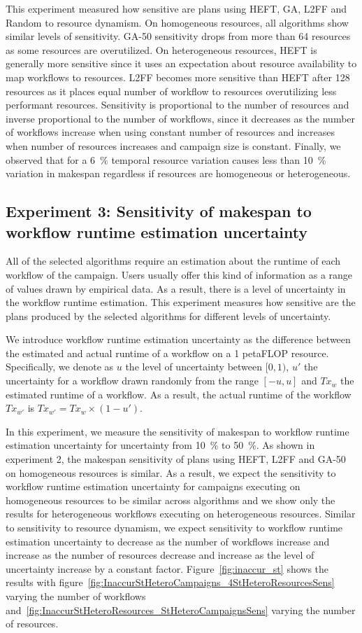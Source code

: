 This experiment measured how sensitive are plans using HEFT, GA, L2FF and Random to resource dynamism.
On homogeneous resources, all algorithms show similar levels of sensitivity.
GA-50 sensitivity drops from more than 64 resources as some resources are overutilized.
On heterogeneous resources, HEFT is generally more sensitive since it uses an expectation about resource availability to map workflows to resources.
L2FF becomes more sensitive than HEFT after 128 resources as it places equal number of workflow to resources overutilizing less performant resources.
Sensitivity is proportional to the number of resources and inverse proportional to the number of workflows, since it decreases as the number of workflows increase when using constant number of resources and increases when number of resources increases and campaign size is constant.
Finally, we observed that for a 6~\% temporal resource variation causes less than 10~\% variation in makespan regardless if resources are homogeneous or heterogeneous.


\subsection{Experiment 3: Sensitivity of makespan to workflow runtime estimation uncertainty}

All of the selected algorithms require an estimation about the runtime of each workflow of the campaign.
Users usually offer this kind of information as a range of values drawn by empirical data.
As a result, there is a level of uncertainty in the workflow runtime estimation.
This experiment measures how sensitive are the plans produced by the selected algorithms for different levels of uncertainty.

We introduce workflow runtime estimation uncertainty as the difference between the estimated and actual runtime of a workflow on a 1 petaFLOP resource.
Specifically, we denote as $u$ the level of uncertainty between $[0,1)$, $u'$ the uncertainty for a workflow drawn randomly from the range $[-u,u]$ and $Tx_{w}$ the estimated runtime of a workflow.
As a result, the actual runtime of the workflow $Tx_{w'}$ is $ Tx_{w'} = Tx_{w} \times (1-u')$.

In this experiment, we measure the sensitivity of makespan to workflow runtime estimation uncertainty for uncertainty from 10~\% to 50~\%.
As shown in experiment 2, the makespan sensitivity of plans using HEFT, L2FF and GA-50 on homogeneous resources is similar.
As a result, we expect the sensitivity to workflow runtime estimation uncertainty for campaigns executing on homogeneous resources to be similar across algorithms and we show only the results for heterogeneous workflows executing on heterogeneous resources.
Similar to sensitivity to resource dynamism, we expect sensitivity to workflow runtime estimation uncertainty to decrease as the number of workflows increase and increase as the number of resources decrease and increase as the level of uncertainty increase by a constant factor.
Figure~\ref{fig:inaccur_st} shows the results with figure~\ref{fig:InaccurStHeteroCampaigns_4StHeteroResourcesSens} varying the number of workflows and~\ref{fig:InaccurStHeteroResources_StHeteroCampaignsSens} varying the number of resources.

